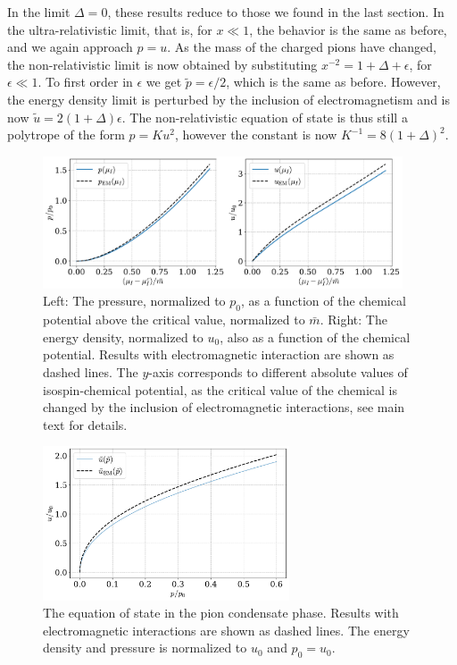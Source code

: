%
In the limit $\Delta = 0$, these results reduce to those we found in the last section.
In the ultra-relativistic limit, that is, for  $x \ll 1$, the behavior is the same as before, and we again approach $p = u$.
As the mass of the charged pions have changed, the non-relativistic limit is now obtained by substituting $x^{-2} = 1 + \Delta + \epsilon$, for $\epsilon \ll 1$.
To first order in $\epsilon$ we get $\tilde p = \epsilon / 2$, which is the same as before.
However, the energy density limit is perturbed by the inclusion of electromagnetism and is now $\tilde u = 2(1 + \Delta) \epsilon$.
The non-relativistic equation of state is thus still a polytrope of the form $p = K u^2$, however the constant is now $K^{-1} = 8 (1+\Delta)^2$.


\begin{figure}[!htb]
    \centering
    \includegraphics[width=0.95\textwidth]{../scripts/figurer/pion_star/pion_up.pdf}
    \caption{
        Left: The pressure, normalized to $p_0$, as a function of the chemical potential above the critical value, normalized to $\bar m$.
        Right: The energy density, normalized to $u_0$, also as a function of the chemical potential.
        Results with electromagnetic interaction are shown as dashed lines.
        The $y$-axis corresponds to different absolute values of isospin-chemical potential, as the critical value of the chemical is changed by the inclusion of electromagnetic interactions, see main text for details.
        }
        \label{fig: pressure and energy with EM interaction}
\end{figure}



\begin{figure}[!htb]
    \centering
    \includegraphics[width=0.65\textwidth]{../scripts/figurer/pion_star/pion_eos_EM.pdf}
    \caption{
        The equation of state in the pion condensate phase. 
        Results with electromagnetic interactions are shown as dashed lines.
        The energy density and pressure is normalized to $u_0$ and $p_0 = u_0$.
        }
    \label{fig: eos chpt em interaction}
\end{figure}





